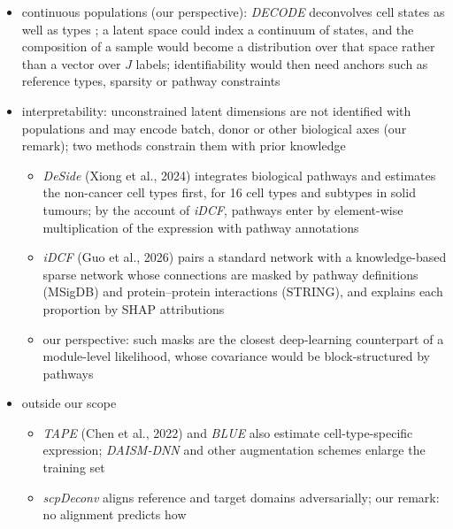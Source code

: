 \begin{itemize}
\begin{itemize}
  \end{itemize}
  \item continuous populations (our perspective): \emph{DECODE} deconvolves cell states as well as types
        \cite{zhaoDecodeDeepLearningBased2026}; a latent space could index a continuum of states, and the composition
        of a sample would become a distribution over that space rather than a vector over \(J\) labels; identifiability
        would then need anchors such as reference types, sparsity or pathway constraints
  \item interpretability: unconstrained latent dimensions are not identified with populations and may encode batch,
        donor or other biological axes (our remark); two methods constrain them with prior knowledge
  \begin{itemize}
    \item \emph{DeSide} (Xiong et al., 2024) integrates biological pathways and estimates the non-cancer cell types first, for 16 cell types
          and subtypes in solid tumours; by the account of \emph{iDCF}, pathways enter by element-wise multiplication
          of the expression with pathway annotations
    \item \emph{iDCF} (Guo et al., 2026) pairs a standard network with a knowledge-based sparse network whose connections are masked by
          pathway definitions (MSigDB) and protein--protein interactions (STRING), and explains each proportion by
          SHAP attributions
    \item our perspective: such masks are the closest deep-learning counterpart of a module-level likelihood, whose
          covariance would be block-structured by pathways
  \end{itemize}
  \item outside our scope
  \begin{itemize}
    \item \emph{TAPE} (Chen et al., 2022) and \emph{BLUE} also estimate cell-type-specific expression; \emph{DAISM-DNN} and other
          augmentation schemes enlarge the training set
    \item \emph{scpDeconv} aligns reference and target domains adversarially; our remark: no alignment predicts how

\end{itemize}
\end{itemize}
